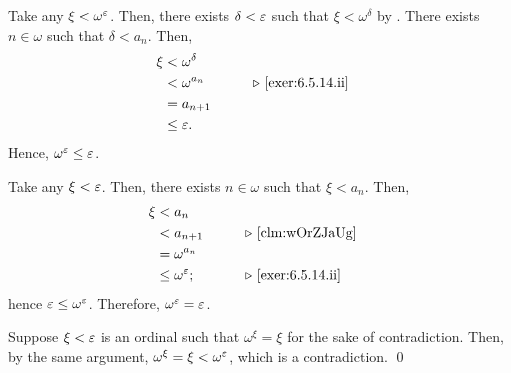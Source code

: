 \documentclass[../introduction_to_set_theory_Note.tex]{subfiles}
\begin{document}
{\begin{enumerate}[nolistsep, label=(\roman*), leftmargin=*, listparindent=\parindent]
    Take any \(\xi < \omega^\varepsilon\). Then, there exists \(\delta < \varepsilon\)
    such that \(\xi < \omega^{\delta}\) by . There exists \(n \in \omega\)
    such that \(\delta < a_n\). Then,
    \begin{alignat*}{2}
        \xi
        &< \omega^\delta &\qquad \\
        &< \omega^{a_n} && \comment*{\ref{exer:6.5.14.ii}} \\
        &= a_{n+1} \\
        &\le \veps.
    \end{alignat*}
    Hence, \(\omega^\varepsilon \le \varepsilon\).

    Take any \(\xi < \varepsilon\). Then, there exists \(n \in \omega\)
    such that \(\xi < a_n\). Then,
    \begin{alignat*}{2}
        \xi
        &< a_n &\qquad \\
        &< a_{n+1} && \comment*{\Cref{clm:wOrZJaUg}} \\
        &= \omega^{a_n} \\
        &\le \omega^\veps; && \comment*{\ref{exer:6.5.14.ii}}
    \end{alignat*}
    hence \(\varepsilon \le \omega^\varepsilon\).
    Therefore, \(\omega^\varepsilon = \varepsilon\).

    Suppose \(\xi < \varepsilon\) is an ordinal such that \(\omega^\xi = \xi\) for the sake of contradiction.
    Then, by the same argument, \(\omega^\xi = \xi < \omega^\varepsilon\),
    which is a contradiction. \qed
\end{enumerate}
}
\end{document}

